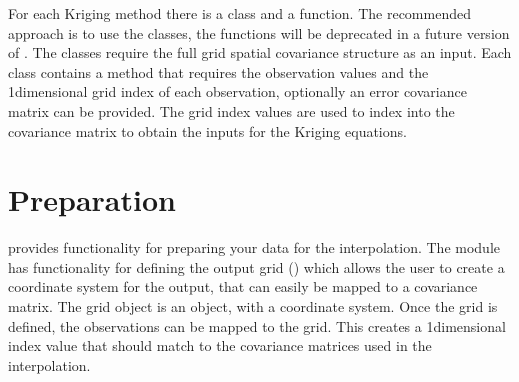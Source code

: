 \documentclass[letterpaper,10pt,english]{sphinxmanual}
\begin{document}
\sphinxAtStartPar
For each Kriging method there is a class and a function. The recommended approach is to use the
classes, the functions will be deprecated in a future version of . The classes
require the full grid spatial covariance structure as an input. Each class contains a  method
that requires the observation values and the 1\sphinxhyphen{}dimensional grid index of each observation,
optionally an error covariance matrix can be provided. The grid index values are used to index into
the covariance matrix to obtain the inputs for the Kriging equations.


\section{Preparation}
\label{\detokenize{kriging:preparation}}
\sphinxAtStartPar
{} provides functionality for preparing your data for the interpolation. The 
module has functionality for defining the output grid
({\hyperref[\detokenize{covariance:glomar_gridding.grid.grid_from_resolution}]{}}) which allows the user to create a coordinate
system for the output, that can easily be mapped to a covariance matrix. The grid object is an
 object, with a coordinate system. Once the grid is defined, the observations can
be mapped to the grid. This creates a 1\sphinxhyphen{}dimensional index value that should match to the covariance
matrices used in the interpolation.
\end{document}

